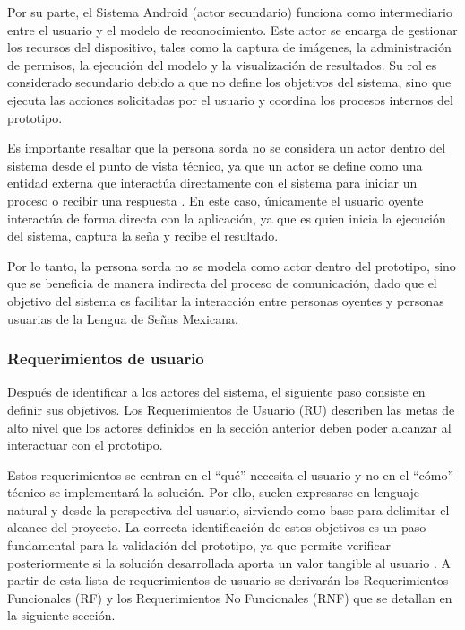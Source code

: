 	Por su parte, el Sistema Android (actor secundario) funciona como intermediario entre el usuario y el modelo de reconocimiento. Este actor se encarga de gestionar los recursos del dispositivo, tales como la captura de imágenes, la administración de permisos, la ejecución del modelo y la visualización de resultados. Su rol es considerado secundario debido a que no define los objetivos del sistema, sino que ejecuta las acciones solicitadas por el usuario y coordina los procesos internos del prototipo.
	
	Es importante resaltar que la persona sorda no se considera un actor dentro del sistema desde el punto de vista técnico, ya que un actor se define como una entidad externa que interactúa directamente con el sistema para iniciar un proceso o recibir una respuesta \cite{dennis2012}. En este caso, únicamente el usuario oyente interactúa de forma directa con la aplicación, ya que es quien inicia la ejecución del sistema, captura la seña y recibe el resultado.
	
	Por lo tanto, la persona sorda no se modela como actor dentro del prototipo, sino que se beneficia de manera indirecta del proceso de comunicación, dado que el objetivo del sistema es facilitar la interacción entre personas oyentes y personas usuarias de la Lengua de Señas Mexicana.
	
	\subsubsection{Requerimientos de usuario}
	
	Después de identificar a los actores del sistema, el siguiente paso consiste en definir sus objetivos. Los Requerimientos de Usuario (RU) describen las metas de alto nivel que los actores definidos en la sección anterior deben poder alcanzar al interactuar con el prototipo.
	
	Estos requerimientos se centran en el ``qué'' necesita el usuario y no en el ``cómo'' técnico se implementará la solución. Por ello, suelen expresarse en lenguaje natural y desde la perspectiva del usuario, sirviendo como base para delimitar el alcance del proyecto. La correcta identificación de estos objetivos es un paso fundamental para la validación del prototipo, ya que permite verificar posteriormente si la solución desarrollada aporta un valor tangible al usuario \cite{dennis2012,sommerville2016}. A partir de esta lista de requerimientos de usuario se derivarán los Requerimientos Funcionales (RF) y los Requerimientos No Funcionales (RNF) que se detallan en la siguiente sección.
	
